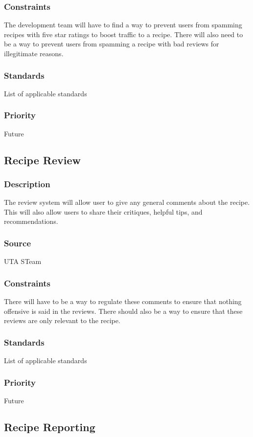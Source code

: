 \subsubsection{Constraints}
The development team will have to find a way to prevent users from spamming recipes with five star ratings to boost traffic to a recipe. There will also need to be a way to prevent users from spamming a recipe with bad reviews for illegitimate reasons.
\subsubsection{Standards}
List of applicable standards
\subsubsection{Priority}
Future

\subsection{Recipe Review}
\subsubsection{Description}
The review system will allow user to give any general comments about the recipe. This will also allow users to share their critiques, helpful tips, and recommendations. 
\subsubsection{Source}
UTA STeam
\subsubsection{Constraints}
There will have to be a way to regulate these comments to ensure that nothing offensive is said in the reviews. There should also be a way to ensure that these reviews are only relevant to the recipe.
\subsubsection{Standards}
List of applicable standards
\subsubsection{Priority}
Future

\subsection{Recipe Reporting}

